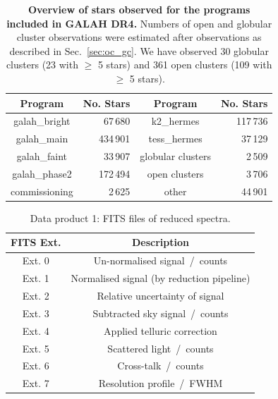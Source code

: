 \documentclass[
  journal=pasa,
  manuscript=research-paper, %
  year=2024,
  volume=37
]{cup-journal}
\begin{document}
\begin{table}
\centering
 \caption{\textbf{Overview of stars observed for the programs included in GALAH DR4.} Numbers of open and globular cluster observations were estimated after observations as described in Sec.~\ref{sec:oc_gc}. We have observed 30 globular clusters (23 with $\geq$ 5 stars) and 361 open clusters (109 with $\geq$ 5 stars).}
\label{tab:field_ids}
\begin{tabular}{crcr}
\hline \hline
Program & No. Stars & Program & No. Stars \\
\hline
galah\_bright & 67\,680 & 
k2\_hermes & 117\,736\\
galah\_main & 434\,901 & 
tess\_hermes & 37\,129\\
galah\_faint & 33\,907 & 
globular clusters & 2\,509\\ %
galah\_phase2 & 172\,494 & 
open clusters & 3\,706\\ %
commissioning & 2\,625 & 
other & 44\,901\\
  \hline
 \end{tabular}
\end{table}

\begin{table}
    \centering
    \caption{Data product 1: FITS files of reduced spectra.}
    \label{tab:reduction_fits}
    \begin{tabular}{cc}
    \hline \hline
    FITS Ext. & Description \\
    \hline
    Ext. 0 & Un-normalised signal~/~counts \\
    Ext. 1 & Normalised signal (by reduction pipeline) \\
    Ext. 2 & Relative uncertainty of signal \\
    Ext. 3 & Subtracted sky signal~/~counts \\
    Ext. 4 & Applied telluric correction \\
    Ext. 5 & Scattered light~/~counts \\
    Ext. 6 & Cross-talk~/~counts \\
    Ext. 7 & Resolution profile~/~FWHM \\
    \hline
    \end{tabular}
\end{table}
\end{document}
